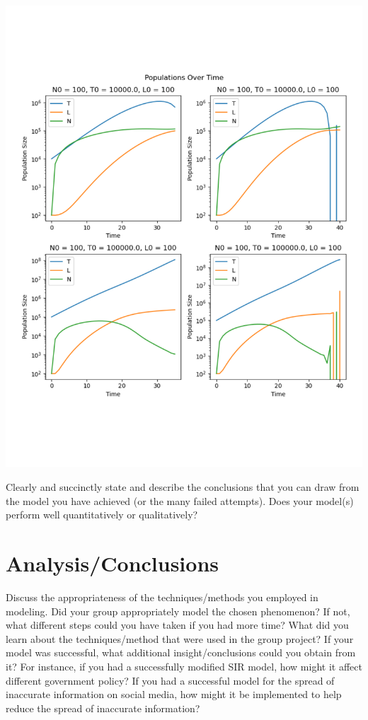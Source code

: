 \documentclass[11pt]{amsart}
\begin{document}
\includegraphics[width=\textwidth]{./images/forward_immune.pdf}

Clearly and succinctly state and describe the conclusions that you can draw from the model you have achieved (or the many failed attempts). Does your model(s) perform well quantitatively or qualitatively?

\section{Analysis/Conclusions}

Discuss the appropriateness of the techniques/methods you employed in modeling. Did your group appropriately model the chosen phenomenon? If not, what different steps could you have taken if you had more time? What did you learn about the techniques/method that were used in the group project? If your model was successful, what additional insight/conclusions could you obtain from it? For instance, if you had a successfully modified SIR model, how might it affect different government policy? If you had a successful model for the spread of inaccurate information on social media, how might it be implemented to help reduce the spread of inaccurate information?
\end{document}
